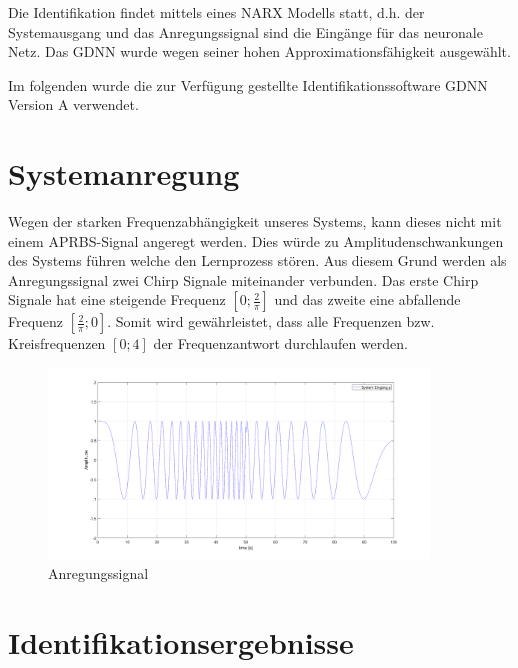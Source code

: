 \documentclass[paper=a4, fontsize=11pt]{scrartcl} %
\numberwithin{equation}{section} %
\numberwithin{figure}{section} %
\numberwithin{table}{section} %
\begin{document}
Die Identifikation findet mittels eines NARX Modells statt, d.h. der Systemausgang und das Anregungssignal sind die Eingänge für das neuronale Netz. Das GDNN wurde wegen seiner hohen Approximationsfähigkeit ausgewählt. 

Im folgenden wurde die zur Verfügung gestellte Identifikationssoftware GDNN Version A verwendet.

\section{Systemanregung}

Wegen der starken Frequenzabhängigkeit unseres Systems, kann dieses nicht mit einem APRBS-Signal angeregt werden. Dies würde zu Amplitudenschwankungen des Systems führen welche den Lernprozess stören. Aus diesem Grund werden als Anregungssignal zwei Chirp Signale miteinander verbunden. Das erste Chirp Signale hat eine steigende Frequenz $\left[0; \frac{2}{\pi}\right]$ und das zweite eine abfallende Frequenz $\left[\frac{2}{\pi};0\right]$. Somit wird gewährleistet, dass alle Frequenzen bzw. Kreisfrequenzen $\left[0;4\right]$ der Frequenzantwort durchlaufen werden.
\begin{figure}[!h]
	\centering
		\includegraphics[width=0.9\textwidth]{./AnregungChirp.png}
	\caption{Anregungssignal}
	\label{fig:AnregungChirp}
\end{figure}
\newpage

\section{Identifikationsergebnisse}
\end{document}
